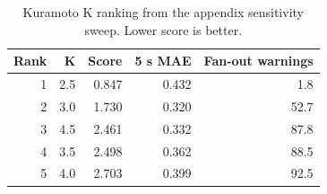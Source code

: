 \begin{table}[htbp]
\centering
\footnotesize
\caption{Kuramoto K ranking from the appendix sensitivity sweep. Lower score is better.}
\label{tab:k_ranking}
\begin{tabular}{@{}rrrrr@{}}
\toprule
\textbf{Rank} & \textbf{K} & \textbf{Score} & \textbf{5 s MAE} & \textbf{Fan-out warnings} \\
\midrule
1 & 2.5 & 0.847 & 0.432 & 1.8 \\
2 & 3.0 & 1.730 & 0.320 & 52.7 \\
3 & 4.5 & 2.461 & 0.332 & 87.8 \\
4 & 3.5 & 2.498 & 0.362 & 88.5 \\
5 & 4.0 & 2.703 & 0.399 & 92.5 \\
\bottomrule
\end{tabular}
\end{table}
